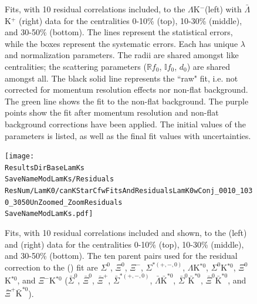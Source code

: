 \documentclass[../AnalysisNoteJBuxton.tex]{subfiles}
\renewcommand{\ResNum}{_10Res}
\renewcommand{\SaveNameModLamKch}{\MomRes\NonFlatBgd\ResNum\PrimMaxDecay\ResMethod\ParamFixAndShareLamKch}
\renewcommand{\SaveNameModLamKs}{\MomRes\NonFlatBgd\ResNum\PrimMaxDecay\ResMethod\ParamFixAndShareLamKs}
\begin{document}
\begin{landscape}
\begin{figure}[h!]
  \centering
  \caption[$\Lambda$K$^{-}$($\bar{\Lambda}$K$^{+}$) Fits with 10 Residuals]{Fits, with 10 residual correlations included, to the $\Lambda$K$^{-}$(left) with $\bar{\Lambda}$K$^{+}$ (right) data for the centralities 0-10\% (top), 10-30\% (middle), and 30-50\% (bottom).
The lines represent the statistical errors, while the boxes represent the systematic errors.  
Each has unique $\lambda$ and normalization parameters.
The radii are shared amongst like centralities; the scattering parameters ($\mathbb{R}f_{0}$, $\mathbb{I}f_{0}$, $d_{0}$) are shared amongst all.
The black solid line represents the ``raw" fit, i.e. not corrected for momentum resolution effects nor non-flat background.  
The green line shows the fit to the non-flat background.
The purple points show the fit after momentum resolution and non-flat background corrections have been applied.
The initial values of the parameters is listed, as well as the final fit values with uncertainties.}
  \label{fig:LamKchMwConjFits_10Res}
\end{figure}



\begin{figure}[h]
  \centering
  \texttt{[image: \\ResultsDirBaseLamKs\\SaveNameModLamKs/Residuals\\ResNum/LamK0/canKStarCfwFitsAndResidualsLamK0wConj\_0010\_1030\_3050UnZoomed\_ZoomResiduals\\SaveNameModLamKs.pdf]}
  \caption[\LamALamKs Fits showing 10 Residuals]{Fits, with 10 residual correlations included and shown, to the \LamKs (left) and \ALamKs (right) data for the centralities 0-10\% (top), 10-30\% (middle), and 30-50\% (bottom).  The ten parent pairs used for the residual correction to the \LamKs (\ALamKs) fit are $\Sigma^{0}$\Ks, $\Xi^{0}$\Ks, $\Xi^{-}$\Ks, $\Sigma^{*(+,-,0)}$\Ks, $\Lambda$K$^{*0}$, $\Sigma^{0}$K$^{*0}$, $\Xi^{0}$K$^{*0}$, and $\Xi^{-}$K$^{*0}$ ($\bar{\Sigma}^{0}$\Ks, $\bar{\Xi}^{0}$\Ks, $\bar{\Xi}^{+}$\Ks, $\bar{\Sigma}^{*(+,-,0)}$\Ks, $\bar{\Lambda}\bar{\mathrm{K}}^{*0}$, $\bar{\Sigma}^{0}\bar{\mathrm{K}}^{*0}$, $\bar{\Xi}^{0}\bar{\mathrm{K}}^{*0}$, and $\bar{\Xi}^{+}\bar{\mathrm{K}}^{*0}$).}
  \label{fig:LamK0wConjFitsAndResiduals_10Res}
\end{figure}



\end{landscape}
\end{document}
